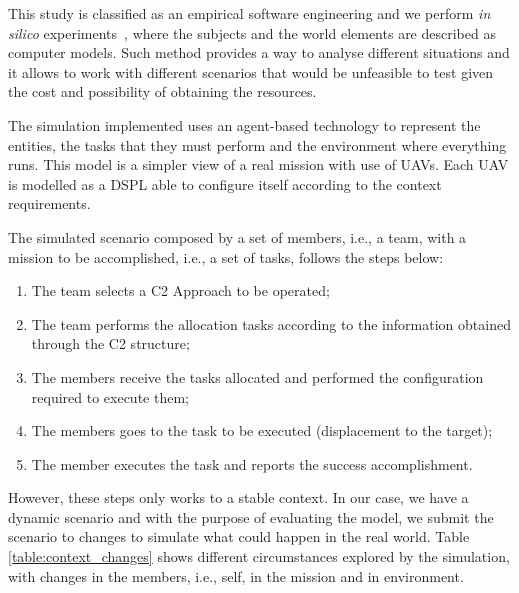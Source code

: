 



This study is classified as an empirical software engineering and we perform \textit{in silico} experiments~\cite{simulation01}, where the subjects and the world elements are described as computer models. Such method provides a way to analyse different situations and it allows to work with different scenarios that would be unfeasible to test given the cost and possibility of obtaining the resources.


The simulation implemented uses an agent-based technology to represent the entities, the tasks that they must perform and the environment where everything runs. This model is a simpler view of a real mission with use of UAVs. Each UAV is modelled as a DSPL able to configure itself according to the context requirements.

The simulated scenario composed by a set of members, i.e., a team, with a mission to be accomplished, i.e., a set of tasks, follows the steps below:

\begin{enumerate}
    \item The team selects a C2 Approach to be operated;
    \item The team performs the allocation tasks according to the information obtained through the C2 structure;
    \item The members receive the tasks allocated and performed the configuration required to execute them;
    \item The members goes to the task to be executed (displacement to the target);
    \item The member executes the task and reports the success accomplishment.
\end{enumerate}

However, these steps only works to a stable context. In our case, we have a dynamic scenario and with the purpose of evaluating the model, we submit the scenario to changes to simulate what could happen in the real world. Table \ref{table:context_changes} shows different circumstances explored by the simulation, with changes in the members, i.e., self, in the mission and in environment.

